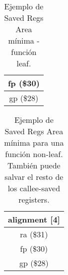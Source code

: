\begin{table}[!h]
\begin{center}
\begin{tabular}{|c|}\hline
fp (\$30)\\\hline
gp (\$28)\\\hline
\end{tabular}
\caption{Ejemplo de Saved Regs Area mínima - función leaf.}
\end{center}
\end{table}


\begin{table}[!h]
\begin{center}
\begin{tabular}{|c|}\hline
alignment [4]\\\hline
ra (\$31)\\\hline
fp (\$30)\\\hline
gp (\$28)\\\hline
\end{tabular}
\caption{Ejemplo de Saved Regs Area mínima para una función non-leaf. También puede salvar el resto de los callee-saved registers.}
\end{center}
\end{table}
